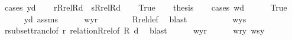 \begin{isabellebody}
%
\isadelimproof
%
\endisadelimproof
%
\isatagproof
{}\isamarkupfalse%
\ {\isacharparenleft}{\kern0pt}cases\ {\isachardoublequoteopen}y{\isasymin}d{\isachardoublequoteclose}{\isacharparenright}{\kern0pt}\isanewline
\ \ \isamarkupfalse%
\ {\isacharquery}{\kern0pt}r{\isacharequal}{\kern0pt}{\isachardoublequoteopen}Rrel{\isacharparenleft}{\kern0pt}R{\isacharcomma}{\kern0pt}d{\isacharparenright}{\kern0pt}{\isachardoublequoteclose}\ \ {\isacharquery}{\kern0pt}s{\isacharequal}{\kern0pt}{\isachardoublequoteopen}{\isacharparenleft}{\kern0pt}Rrel{\isacharparenleft}{\kern0pt}R{\isacharcomma}{\kern0pt}d{\isacharparenright}{\kern0pt}{\isacharparenright}{\kern0pt}{\isacharcircum}{\kern0pt}{\isacharplus}{\kern0pt}{\isachardoublequoteclose}\isanewline
\ \ \isamarkupfalse%
\ True\isanewline
\ \ \isamarkupfalse%
\ {\isacharquery}{\kern0pt}thesis\isanewline
\ \ \isamarkupfalse%
\ {\isacharparenleft}{\kern0pt}cases\ {\isachardoublequoteopen}w{\isasymin}d{\isachardoublequoteclose}{\isacharparenright}{\kern0pt}\isanewline
\ \ \ \ \isamarkupfalse%
\ True\isanewline
\ \ \ \ \isamarkupfalse%
\ {\isacartoucheopen}y{\isasymin}d{\isacartoucheclose}\ assms\isanewline
\ \ \ \ \isamarkupfalse%
\ {\isachardoublequoteopen}{\isasymlangle}w{\isacharcomma}{\kern0pt}y{\isasymrangle}{\isasymin}{\isacharquery}{\kern0pt}r{\isachardoublequoteclose}\isanewline
\ \ \ \ \ \ \isamarkupfalse%
\ Rrel{\isacharunderscore}{\kern0pt}def\ \isamarkupfalse%
\ blast\isanewline
\ \ \ \ \isamarkupfalse%
\isanewline
\ \ \ \ \isamarkupfalse%
\ {\isachardoublequoteopen}{\isasymlangle}w{\isacharcomma}{\kern0pt}y{\isasymrangle}{\isasymin}{\isacharquery}{\kern0pt}s{\isachardoublequoteclose}\isanewline
\ \ \ \ \ \ \isamarkupfalse%
\ r{\isacharunderscore}{\kern0pt}subset{\isacharunderscore}{\kern0pt}trancl{\isacharbrackleft}{\kern0pt}of\ {\isacharquery}{\kern0pt}r{\isacharbrackright}{\kern0pt}\ relation{\isacharunderscore}{\kern0pt}Rrel{\isacharbrackleft}{\kern0pt}of\ R\ d{\isacharbrackright}{\kern0pt}\ \isamarkupfalse%
\ blast\isanewline
\ \ \ \ \isamarkupfalse%
\ {\isacartoucheopen}{\isasymlangle}w{\isacharcomma}{\kern0pt}y{\isasymrangle}{\isasymin}{\isacharquery}{\kern0pt}r{\isacartoucheclose}\isanewline
\ \ \ \ \isamarkupfalse%
\ {\isachardoublequoteopen}w{\isasymin}{\isacharquery}{\kern0pt}r{\isacharminus}{\kern0pt}{\isacharbackquote}{\kern0pt}{\isacharbackquote}{\kern0pt}{\isacharbraceleft}{\kern0pt}y{\isacharbraceright}{\kern0pt}{\isachardoublequoteclose}\ {\isachardoublequoteopen}w{\isasymin}{\isacharquery}{\kern0pt}s{\isacharminus}{\kern0pt}{\isacharbackquote}{\kern0pt}{\isacharbackquote}{\kern0pt}{\isacharbraceleft}{\kern0pt}y{\isacharbraceright}{\kern0pt}{\isachardoublequoteclose}\isanewline

\end{isabellebody}

